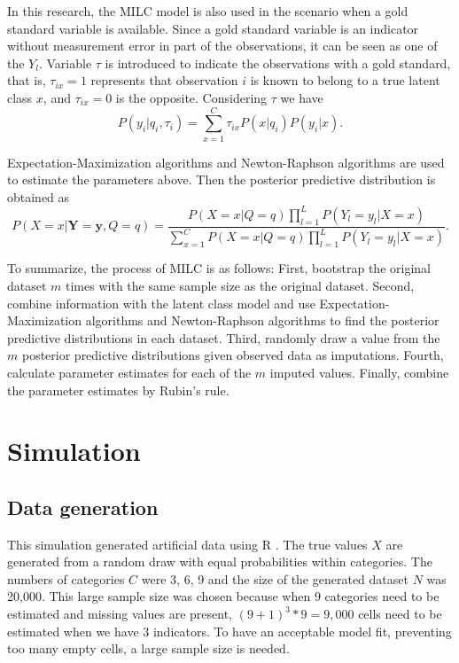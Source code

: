 \documentclass[oneside,a4paper]{article}
\begin{document}
In this research, the MILC model is also used in the scenario when a gold standard variable is available. Since a gold standard variable is an indicator without measurement error in part of the observations, it can be seen as one of the $Y_l$. Variable $\tau$ is introduced to indicate the observations with a gold standard, that is, $\tau_{ix} = 1$ represents that observation $i$ is known to belong to a true latent class $x$, and $\tau_{ix} = 0$ is the opposite. Considering $\tau$ we have
\begin{equation}
P(y_i | q_i,\tau_i) = \sum_{x=1}^C \tau_{ix} P(x | q_i) P(y_i | x).
\end{equation}

Expectation-Maximization algorithms and Newton-Raphson algorithms are used to estimate the parameters above. Then the posterior predictive distribution is obtained as
\begin{equation}
P(X=x|\textbf{Y} = \textbf{y}, Q = q) = \frac{P(X=x | Q = q) \prod_{l=1}^L P(Y_l = y_l | X = x)}{\sum_{x=1}^C P(X=x | Q = q)  \prod_{l=1}^L P(Y_l = y_l | X =x)}.
\end{equation}

To summarize, the process of MILC is as follows: First, bootstrap the original dataset $m$ times with the same sample size as the original dataset. Second, combine information with the latent class model and use Expectation-Maximization algorithms and Newton-Raphson algorithms to find the posterior predictive distributions in each dataset. Third, randomly draw a value from the $m$ posterior predictive distributions given observed data as imputations. Fourth, calculate parameter estimates for each of the $m$ imputed values. Finally, combine the parameter estimates by Rubin's rule.
 \section{Simulation}

\subsection{Data generation}
This simulation generated artificial data using R \cite{R}. The true values $X$ are generated from a random draw with equal probabilities within categories. The numbers of categories $C$ were 3, 6, 9 and the size of the generated dataset $N$ was 20,000. This large sample size was chosen because when 9 categories need to be estimated and missing values are present, $(9 +1 )^3*9 =9,000$ cells need to be estimated when we have 3 indicators. To have an acceptable model fit, preventing too many empty cells, a large sample size is needed.
\end{document}
